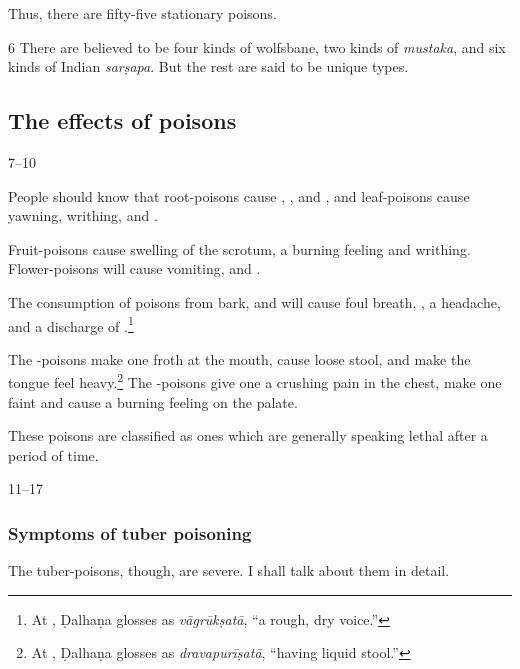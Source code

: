 \begin{translation}
    Thus, there are fifty-five stationary poisons.
    
    \item[6] There are believed to be four kinds of wolfsbane, two kinds of
\emph{mustaka}, and six kinds of Indian \emph{sarṣapa}.  But the rest are said
to be unique types.
    
    
    
    \subsection{The effects of poisons}
    \item[7--10]
    
People should know that root-poisons cause , 
, and
, and  leaf-poisons cause yawning, writhing, and 
.
    
 Fruit-poisons cause swelling of the
   scrotum, a burning feeling and writhing.  Flower-poisons will
    cause vomiting,  and .  
    
The consumption of poisons from bark,  and  
will
cause foul breath, , a headache, and a
discharge of .\footnote{At , Ḍalhaṇa
glosses  as \emph{vāgrūkṣatā}, “a rough, 
dry voice.”}
    
    
     The -poisons make one froth at the mouth,  cause loose
stool, and make the tongue feel heavy.\footnote{At , Ḍalhaṇa
glosses  as \emph{dravapurīṣatā}, “having liquid
stool.” }  The -poisons give one a crushing pain in the
chest, make one faint and cause a burning feeling on the palate.
    
    These poisons
    are classified as ones which are generally speaking lethal after a period of time.
    
    \item[11--17]
    
    \subsubsection{Symptoms of tuber poisoning}
    The tuber-poisons, though, are severe.  I shall talk about them in detail.
    
    

\end{translation}
